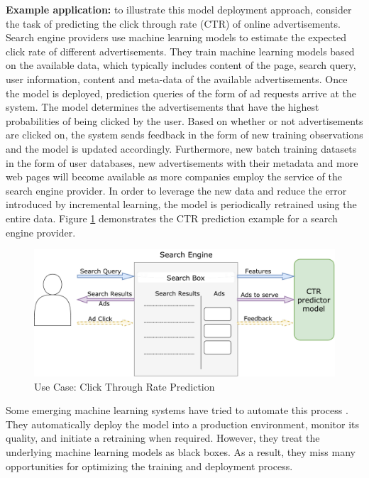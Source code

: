 \documentclass{vldb}
\begin{document}
\textbf{Example application:} to illustrate this model deployment approach, consider the task of predicting the click through rate (CTR) of online advertisements.
Search engine providers use machine learning models to estimate the expected click rate of different advertisements.
They train machine learning models based on the available data, which typically includes content of the page, search query, user information, content and meta-data of the available advertisements. 
Once the model is deployed, prediction queries of the form of ad requests arrive at the system.
The model determines the advertisements that have the highest probabilities of being clicked by the user.
Based on whether or not advertisements are clicked on, the system sends feedback in the form of new training observations and the model is updated accordingly.
Furthermore, new batch training datasets in the form of user databases, new advertisements with their metadata and more web pages will become available as more companies employ the service of the search engine provider.
In order to leverage the new data and reduce the error introduced by incremental learning, the model is periodically retrained using the entire data.
Figure \ref{fig:click-rate} demonstrates the CTR prediction example for a search engine provider.

\begin{figure}[h]
\centering
\includegraphics[width=\columnwidth]{../images/use-case-4.pdf}
\caption{Use Case: Click Through Rate Prediction}
\label{fig:click-rate}
\end{figure}

Some emerging machine learning systems have tried to automate this process \cite{crankshaw2014missing}.
They automatically deploy the model into a production environment, monitor its quality, and initiate a retraining when required.
However, they treat the underlying machine learning models as black boxes. 
As a result, they miss many opportunities for optimizing the training and deployment process.
\end{document}
